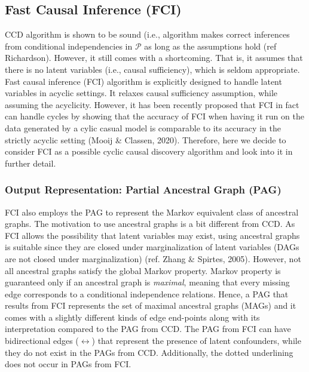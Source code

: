 \documentclass[11pt]{article}
\theoremstyle{definition}
\begin{document}
\subsection{Fast Causal Inference (FCI)}

CCD algorithm is shown to be sound (i.e., algorithm makes correct inferences from conditional independencies in $\mathcal{P}$ as long as the assumptions hold (ref Richardson). However, it still comes with a shortcoming. That is, it assumes that there is no latent variables (i.e., causal sufficiency), which is seldom appropriate. Fast causal inference (FCI) algorithm is explicitly designed to handle latent variables in acyclic settings. It relaxes causal sufficiency assumption, while assuming the acyclicity. However, it has been recently proposed that FCI in fact can handle cycles by showing that the accuracy of FCI when having it run on the data generated by a cylic casual model is comparable to its accuracy in the strictly acyclic setting (Mooij \& Classen, 2020). Therefore, here we decide to consider FCI as a possible cyclic causal discovery algorithm and look into it in further detail.

\subsubsection{Output Representation: Partial Ancestral Graph (PAG)}
FCI also employs the PAG to represent the Markov equivalent class of ancestral graphs. The motivation to use ancestral graphs is a bit different from CCD. As FCI allows the possibility that latent variables may exist, using ancestral graphs is suitable since they are closed under marginalization of latent variables (DAGs are not closed under marginalization) (ref. Zhang \& Spirtes, 2005). However, not all ancestral graphs satisfy the global Markov property. Markov property is guaranteed only if an ancestral graph is \textit{maximal}, meaning that every missing edge corresponds to a conditional independence relations. Hence, a PAG that results from FCI represents the set of maximal ancestral graphs (MAGs) and it comes with a slightly different kinds of edge end-points along with its interpretation compared to the PAG from CCD.
The PAG from FCI can have bidirectional edges ($\leftrightarrow$) that represent the presence of latent confounders, while they do not exist in the PAGs from CCD. Additionally, the dotted underlining does not occur in PAGs from FCI. 
\end{document}
